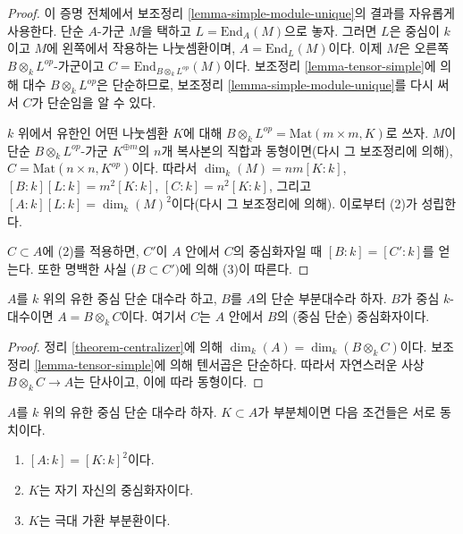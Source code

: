 \begin{proof}
이 증명 전체에서 보조정리 \ref{lemma-simple-module-unique}의 결과를
자유롭게 사용한다. 단순 $A$-가군 $M$을 택하고
$L = \text{End}_A(M)$으로 놓자. 그러면 $L$은 중심이 $k$이고 $M$에
왼쪽에서 작용하는 나눗셈환이며, $A = \text{End}_L(M)$이다.
이제 $M$은 오른쪽 $B \otimes_k L^{op}$-가군이고
$C = \text{End}_{B \otimes_k L^{op}}(M)$이다.
보조정리 \ref{lemma-tensor-simple}에 의해 대수 $B \otimes_k L^{op}$은
단순하므로, 보조정리 \ref{lemma-simple-module-unique}를 다시 써서
$C$가 단순임을 알 수 있다.

\medskip\noindent
$k$ 위에서 유한인 어떤 나눗셈환 $K$에 대해
$B \otimes_k L^{op} = \text{Mat}(m \times m, K)$로 쓰자.
$M$이 단순 $B \otimes_k L^{op}$-가군 $K^{\oplus m}$의 $n$개 복사본의
직합과 동형이면(다시 그 보조정리에 의해),
$C = \text{Mat}(n \times n, K^{op})$이다. 따라서
$\dim_k(M) = nm [K : k]$, $[B : k] [L : k] = m^2 [K : k]$,
$[C : k] = n^2 [K : k]$, 그리고
$[A : k] [L : k] = \dim_k(M)^2$이다(다시 그 보조정리에 의해).
이로부터 (2)가 성립한다.

\medskip\noindent
$C \subset A$에 (2)를 적용하면, $C'$이 $A$ 안에서 $C$의 중심화자일 때
$[B : k] = [C' : k]$를 얻는다. 또한 명백한 사실 ($B \subset C')$에 의해
(3)이 따른다.
\end{proof}

\begin{lemma}
\label{lemma-when-tensor-is-equal}
$A$를 $k$ 위의 유한 중심 단순 대수라 하고, $B$를 $A$의 단순 부분대수라
하자. $B$가 중심 $k$-대수이면 $A = B \otimes_k C$이다. 여기서 $C$는
$A$ 안에서 $B$의 (중심 단순) 중심화자이다.
\end{lemma}

\begin{proof}
정리 \ref{theorem-centralizer}에 의해
$\dim_k(A) = \dim_k(B \otimes_k C)$이다. 보조정리
\ref{lemma-tensor-simple}에 의해 텐서곱은 단순하다. 따라서 자연스러운 사상
$B \otimes_k C \to A$는 단사이고, 이에 따라 동형이다.
\end{proof}

\begin{lemma}
\label{lemma-self-centralizing-subfield}
$A$를 $k$ 위의 유한 중심 단순 대수라 하자. $K \subset A$가 부분체이면
다음 조건들은 서로 동치이다.
\begin{enumerate}
\item $[A : k] = [K : k]^2$이다.
\item $K$는 자기 자신의 중심화자이다.
\item $K$는 극대 가환 부분환이다.
\end{enumerate}
\end{lemma}

